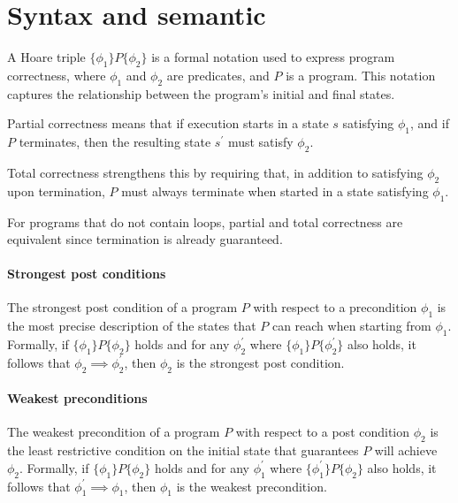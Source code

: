 \section{Syntax and semantic}

A Hoare triple $\{\phi_1\}P\{\phi_2\}$ is a formal notation used to express program correctness, where $\phi_1$ and $\phi_2$ are predicates, and $P$ is a program.
This notation captures the relationship between the program's initial and final states.

\begin{definition}
    Partial correctness means that if execution starts in a state $s$ satisfying $\phi_1$, and if $P$ terminates, then the resulting state $s^\prime$ must satisfy $\phi_2$.
\end{definition}

\begin{definition}
    Total correctness strengthens this by requiring that, in addition to satisfying $\phi_2$ upon termination, $P$ must always terminate when started in a state satisfying $\phi_1$.
\end{definition}
\noindent For programs that do not contain loops, partial and total correctness are equivalent since termination is already guaranteed.

\paragraph*{Strongest post conditions}
The strongest post condition of a program $P$ with respect to a precondition $\phi_1$ is the most precise description of the states that $P$ can reach when starting from $\phi_1$. 
Formally, if $\{\phi_1\}P\{\phi_2\}$ holds and for any $\phi_2^\prime$ where $\{\phi_1\}P\{\phi_2^\prime\}$ also holds, it follows that $\phi_2\implies\phi_2^\prime$, then $\phi_2$ is the strongest post condition.

\paragraph*{Weakest preconditions}
The weakest precondition of a program $P$ with respect to a post condition $\phi_2$ is the least restrictive condition on the initial state that guarantees $P$ will achieve $\phi_2$.
Formally, if $\{\phi_1\}P\{\phi_2\}$ holds and for any $\phi_1^\prime$ where $\{\phi_1^\prime\}P\{\phi_2\}$ also holds, it follows that $\phi_1^\prime\implies\phi_1$, then $\phi_1$ is the weakest precondition.